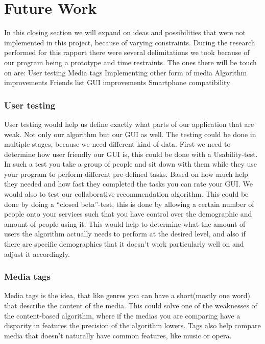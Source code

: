 \section{Future Work}
\label{conclusion:FutureWork}

In this closing section we will expand on ideas and possibilities that were not implemented in this project, because of varying constraints. During the research performed for this rapport there were several delimitations we took because of our program being a prototype and time restraints. The ones there will be touch on are:
User testing
Media tags
Implementing other form of media
Algorithm improvements
Friends list
GUI improvements
Smartphone compatibility 

\subsubsection{User testing}
User testing would help us define exactly what parts of our application that are weak. Not only our algorithm but our GUI as well. The testing could be done in multiple stages, because we need different kind of data. First we need to determine how user friendly our GUI is, this could be done with a Usability-test. In such a test you take a group of people and sit down with them while they use your program to perform different pre-defined tasks. Based on how much help they needed and how fast they completed the tasks you can rate your GUI. We would also to test our collaborative recommendation algorithm. This could be done by doing a “closed beta”-test, this is done by allowing a certain number of people onto your services such that you have control over the demographic and amount of people using it. This would help to determine what the amount of users the algorithm actually needs to perform at the desired level, and also if there are specific demographics that it doesn't work particularly well on and adjust it accordingly.

\subsubsection{Media tags}\label{futureWork:Tags}
Media tags is the idea, that like genres you can have a short(mostly one word) that describe the content of the media. This could solve one of the weaknesses of the content-based algorithm, where if the medias you are comparing have a disparity in features the precision of the algorithm lowers. Tags also help compare media that doesn't naturally have common features, like music or opera.

